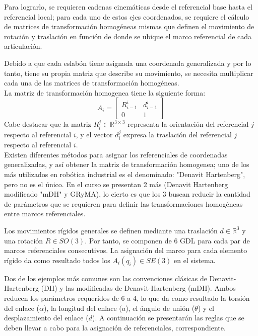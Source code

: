 \documentclass[journal, trans, spanish]{IEEEtran}
\begin{document}
Para lograrlo, se requieren cadenas cinemáticas desde el referencial base hasta el referencial local; para cada uno de estos ejes coordenados, se requiere el cálculo de matrices de transformación homogéneas mismas que definen el movimiento de rotación y traslación en función de donde se ubique el marco referencial de cada articulación. 

Debido a que cada eslabón tiene asignada una coordenada generalizada y por lo tanto, tiene su propia matriz que describe su movimiento, se necesita multiplicar cada una de las matrices de transformación homogéneas.
\\
La matriz de transformación homogenea tiene la siguiente forma:
\begin{equation*} A_i = 
    \begin{bmatrix}
    R^i_{i-1} & d^i_{i-1}\\
    0 & 1
    \end{bmatrix}
\end{equation*}
\noindent Cabe destacar que la matriz $R^j_i \in \mathbb{R}^{3\times 3}$ representa la orientación del referencial $j$ respecto al referencial $i$, y el vector $d^j_{i}$ expresa la traslación del referencial $j$ respecto al referencial $i$.\\

\noindent Existen diferentes métodos para asignar los referenciales de coordenadas generalizadas, y así obtener la matriz de transformación homogenea; uno de los más utilizados en robótica industrial es el denominado: "Denavit Hartenberg", pero no es el único. En el curso se presentan 2 más (Denavit Hartenberg modificado "mDH" y GRyMA), lo cierto es que los 3 buscan reducir la cantidad de parámetros que se requieren para definir las transformaciones homogéneas entre marcos referenciales. 

\noindent Los movimientos rígidos generales se definen mediante una traslación $d \in \mathbb{R}^3$ y una rotación $R \in SO(3)$. Por tanto, se componen de 6 GDL para cada par de marcos referenciales consecutivos. La asignación del marco para cada elemento rígido da como resultado todos los $A_i (q_i) \in SE(3)$ en el sistema.

\noindent Dos de los ejemplos más comunes son las convenciones clásicas de Denavit-Hartenberg (DH) y las modificadas de Denavit-Hartenberg (mDH). Ambos reducen los parámetros requeridos de 6 a 4, lo que da como resultado la torsión del enlace ($\alpha$), la longitud del enlace ($a$), el ángulo de unión ($\theta$) y el desplazamiento del enlace ($d$).
\noindent A continuación se presentarán las reglas que se deben llevar a cabo para la asignación de referenciales, correspondiente.
\\ 
\end{document}

